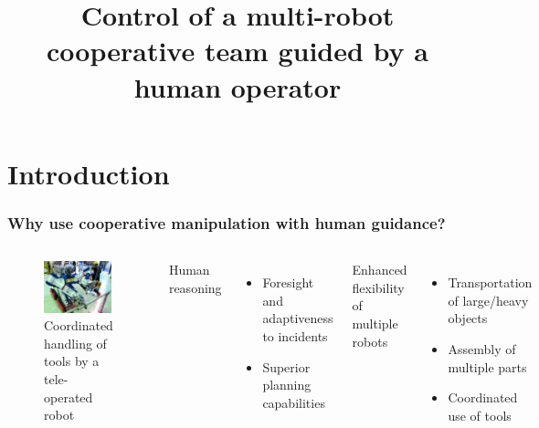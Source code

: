 \documentclass[student]{ITRslides}
\title{Control of a multi-robot cooperative team guided by a human operator}
\begin{document}
\begin{frame}
    \titlepage
\end{frame}


\section{Introduction}

\begin{frame}
	\frametitle{Why use cooperative manipulation with human guidance?}
		\begin{columns}[t]
	
			\begin{figure}
			\centering
			\includegraphics[width=0.98\textwidth]{mhi-meister45.jpg}
			\caption{Coordinated handling of tools by a tele-operated robot \cite{MHI-MEISTeR}}
			\end{figure}
		
			
		Human reasoning
		\begin{itemize}
			\item Foresight and adaptiveness to incidents
			\item Superior planning capabilities
		\end{itemize}
		Enhanced flexibility of multiple robots
			\begin{itemize}
				\item Transportation of large/heavy objects
	\item Assembly of multiple parts 
	\item Coordinated use of tools
			\end{itemize}
			
			\end{columns}
\end{frame}
\end{document}
